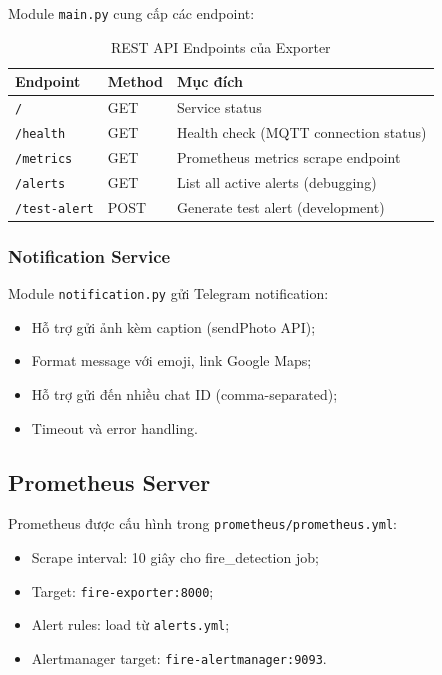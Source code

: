 \documentclass[12pt,a4paper]{report}
\begin{document}
Module \texttt{main.py} cung cấp các endpoint:
\begin{table}[h]
  \centering
  \caption{REST API Endpoints của Exporter}
  \begin{tabular}{llp{6cm}}
    \toprule
    Endpoint & Method & Mục đích \\
    \midrule
    \texttt{/} & GET & Service status \\
    \texttt{/health} & GET & Health check (MQTT connection status) \\
    \texttt{/metrics} & GET & Prometheus metrics scrape endpoint \\
    \texttt{/alerts} & GET & List all active alerts (debugging) \\
    \texttt{/test-alert} & POST & Generate test alert (development) \\
    \bottomrule
  \end{tabular}
\end{table}

\subsubsection{Notification Service}

Module \texttt{notification.py} gửi Telegram notification:
\begin{itemize}
  \item Hỗ trợ gửi ảnh kèm caption (sendPhoto API);
  \item Format message với emoji, link Google Maps;
  \item Hỗ trợ gửi đến nhiều chat ID (comma-separated);
  \item Timeout và error handling.
\end{itemize}

\subsection{Prometheus Server}

Prometheus được cấu hình trong \texttt{prometheus/prometheus.yml}:
\begin{itemize}
  \item Scrape interval: 10 giây cho fire\_detection job;
  \item Target: \texttt{fire-exporter:8000};
  \item Alert rules: load từ \texttt{alerts.yml};
  \item Alertmanager target: \texttt{fire-alertmanager:9093}.
\end{itemize}
\end{document}
